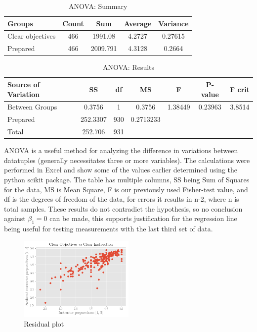 \documentclass[10pt]{report}
\begin{document}
\begin{table}[!htbp]
    \centering

	\begin{tabular}{lcccc}
	\hline
    Groups & Count & Sum & Average & Variance \\
    \hline
    Clear objectives & 466 & 1991.08 & 4.2727 & 0.27615 \\
    Prepared & 466 & 2009.791 & 4.3128 & 0.2664 \\
	\hline
	\end{tabular}

    \caption{ANOVA: Summary}
\end{table}

\begin{table}[!htbp]
    \centering

	\begin{tabular}{lcccccc}
	\hline
        Source of Variation & SS & df & MS & F & P-value & F crit \\
    \hline
    Between Groups & 0.3756 & 1 & 0.3756 & 1.38449 & 0.23963 & 3.8514 \\
    Prepared & 252.3307 & 930 & 0.2713233  & & & \\
    Total & 252.706 & 931 & & & & \\ 
	\hline
	\end{tabular}

    \caption{ANOVA: Results}
\end{table}

ANOVA is a useful method for analyzing the difference in variations between datatuples (generally necessitates
three or more variables). The calculations were performed in Excel and show some of the values earlier determined using 
the python scikit package. The table has multiple columns, SS being Sum of Squares for the data, MS is Mean Square, F is our 
previously used Fisher-test value, and df is the degrees of freedom of the data, for errors it results in n-2, where n is total samples.
These results do not contradict the hypothesis, so no conclusion against $\beta_1 = 0$ can be made, this supports justification
for the regression line being useful for testing measurements with the last third set of data.


\begin{figure}
    \centering
    \includegraphics[width=0.50\textwidth]{results/second_plot}
    \caption{Residual plot}
\end{figure}
\end{document}

